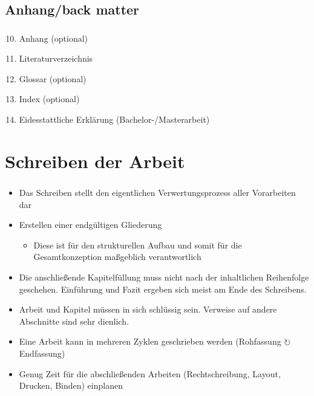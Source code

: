 \documentclass[aspectratio=169]{beamer}
\begin{document}
\subsection{Anhang/back matter}
\begin{frame}
  \frametitle{\insertsection}%
  \framesubtitle{\insertsubsection}%
  \begin{enumerate}
   \setcounter{enumi}{9}
   \item Anhang (optional)
   \item Literaturverzeichnis
   \item Glossar (optional)
   \item Index (optional)
   \item Eidesstattliche Erklärung (Bachelor-/Masterarbeit)
  \end{enumerate}
\end{frame}

\section{Schreiben der Arbeit}
\begin{frame}
  \frametitle{\insertsection}%
  \framesubtitle{\insertsubsection}%
  \begin{itemize}
   \item Das Schreiben stellt den eigentlichen Verwertungsprozess aller Vorarbeiten dar
   \item Erstellen einer endgültigen Gliederung
   \begin{itemize}
    \item Diese ist für den strukturellen Aufbau und somit für die Gesamtkonzeption maßgeblich verantwortlich
   \end{itemize}
   \item Die anschließende Kapitelfüllung muss nicht nach der inhaltlichen Reihenfolge geschehen. Einführung und Fazit ergeben sich meist am Ende des Schreibens.
   \item Arbeit und Kapitel müssen in sich schlüssig sein. Verweise auf andere Abschnitte sind sehr dienlich.
   \item Eine Arbeit kann in mehreren Zyklen geschrieben werden (Rohfassung $\circlearrowright$ Endfassung)
   \item Genug Zeit für die abschließenden Arbeiten (Rechtschreibung, Layout, Drucken, Binden) einplanen
  \end{itemize}
\end{frame}
\end{document}
